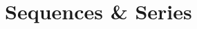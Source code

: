 \documentclass[../main.tex]{subfiles}
\begin{document}
\section{Sequences \& Series}
\end{document}
